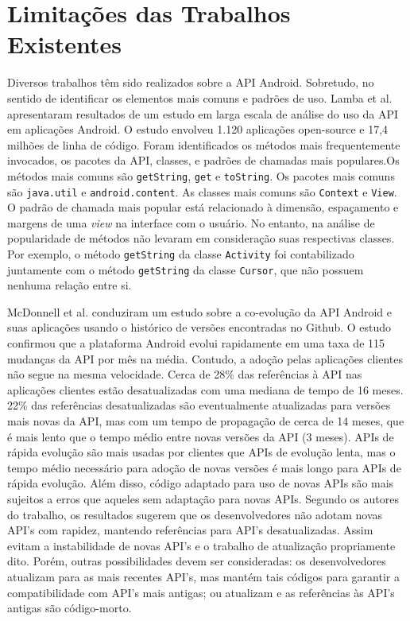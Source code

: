 \section{Limitações das Trabalhos Existentes} \label{sec:limitacao-abordagens-atuais}
Diversos trabalhos têm sido realizados sobre a API Android. Sobretudo, no sentido
de identificar os elementos mais comuns e padrões de uso. Lamba et al.\cite{Lamba2015} apresentaram
resultados de um estudo em larga escala de análise do uso da API em aplicações Android.
O estudo envolveu 1.120 aplicações open-source e 17,4 milhões de linha de código.
Foram identificados os métodos mais frequentemente invocados, os pacotes da API,
classes, e padrões de chamadas mais populares.Os métodos mais comuns são \texttt{getString},
\texttt{get} e \texttt{toString}. Os pacotes mais comuns são \texttt{java.util} e
\texttt{android.content}. As classes mais comuns são \texttt{Context} e \texttt{View}.
O padrão de chamada mais popular está relacionado à dimensão, espaçamento e margens
de uma \textit{view} na interface com o usuário. No entanto, na análise de popularidade
de métodos não levaram em consideração suas respectivas classes. Por exemplo, o método
\texttt{getString} da classe \texttt{Activity} foi contabilizado juntamente com
o método \texttt{getString} da classe \texttt{Cursor}, que não possuem nenhuma
relação entre si.

McDonnell et al. \cite{McDonnell2013} conduziram um estudo sobre a co-evolução
da API Android e suas aplicações usando o histórico de versões encontradas no
Github. O estudo confirmou que a plataforma Android evolui rapidamente em uma
taxa de 115 mudanças da API por mês na média. Contudo, a adoção pelas aplicações
clientes não segue na mesma velocidade. Cerca de 28\% das referências à API nas
aplicações clientes estão desatualizadas com uma mediana de tempo de 16 meses.
22\% das referências desatualizadas são eventualmente atualizadas para versões
mais novas da API, mas com um tempo de propagação de cerca de 14 meses, que é mais
lento que o tempo médio entre novas versões da API (3 meses). APIs de rápida
evolução são mais usadas por clientes que APIs de evolução lenta, mas o tempo
médio necessário para adoção de novas versões é mais longo para APIs de rápida
evolução. Além disso, código adaptado para uso de novas APIs são mais sujeitos a
erros que aqueles sem adaptação para novas APIs. Segundo os autores do trabalho,
os resultados sugerem que os desenvolvedores não adotam novas API’s com rapidez,
mantendo referências para API’s desatualizadas. Assim evitam a instabilidade de
novas API’s e o trabalho de atualização propriamente dito. Porém, outras possibilidades
devem ser consideradas: os desenvolvedores atualizam para as mais recentes API’s,
mas mantém tais códigos para garantir a compatibilidade com API’s mais antigas;
ou atualizam e as referências às API’s antigas são código-morto.

